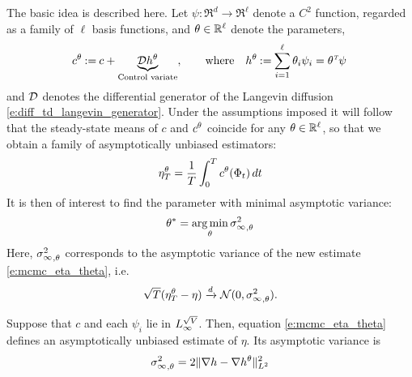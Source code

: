 The basic idea is described here. Let $\psi\colon\Re^d\to\Re^\ell$ denote a $C^2$ function, regarded as a family of $\ell$ basis functions, and $\theta\in\mathbb{R}^\ell$ denote the parameters,
\begin{equation}
\begin{aligned}
c^\param  \eqdef c + \underbrace{\generate h^\param}_{\text{Control variate}},
\qquad
\text{where}
\quad
h^\param  \eqdef  \sum_{i=1}^\ell \param_i \psi_i = \param^\transpose \psi\,
\end{aligned}
\label{e:mcmc_h_and_c}
\end{equation}
and ${\cal D}$ denotes the differential generator of the Langevin diffusion \eqref{e:diff_td_langevin_generator}. 
Under the assumptions imposed it will follow that the steady-state means of $c$ and $c^\theta$ coincide for any $\theta\in\mathbb{R}^\ell$,  so that we obtain a family of asymptotically unbiased estimators: %
\begin{equation}
\eta^\param_T =\frac{1}{T}\int_0^T c^\param(\markovstate_t)  \, dt
\label{e:mcmc_eta_theta}
\end{equation}
It is then of interest to find the parameter with minimal asymptotic variance:
\begin{equation}
\param^* = \argmin_\param {\asymvar}_{,\param}
\label{e:mcmc_theta_star}
\end{equation} %
Here, ${\sigma^2_\infty}_{,\theta}$ corresponds to the asymptotic variance of the new estimate \eqref{e:mcmc_eta_theta}, i.e.
\[
\sqrt{T} (\eta^\theta_T - \eta ) \xrightarrow[]{d} \mathcal{N} (0,{\sigma^2_\infty}_{,\theta}).
\]

\begin{proposition}
	\label{t:mcmc_say_var_cv}
	Suppose that  $c$ and each $\psi_i$ lie in $L_\infty^{\sqrt{V}}$. Then, equation \eqref{e:mcmc_eta_theta} defines an asymptotically unbiased estimate of $\eta$. Its asymptotic variance is
	\begin{equation}
	{\asymvar}_{,\param}
	= 2  \| \nabla  h - \nabla h^\param  \|^2_{L^2}
	\label{e:mcmc_asy_var_cv}
	\end{equation}
\end{proposition}

